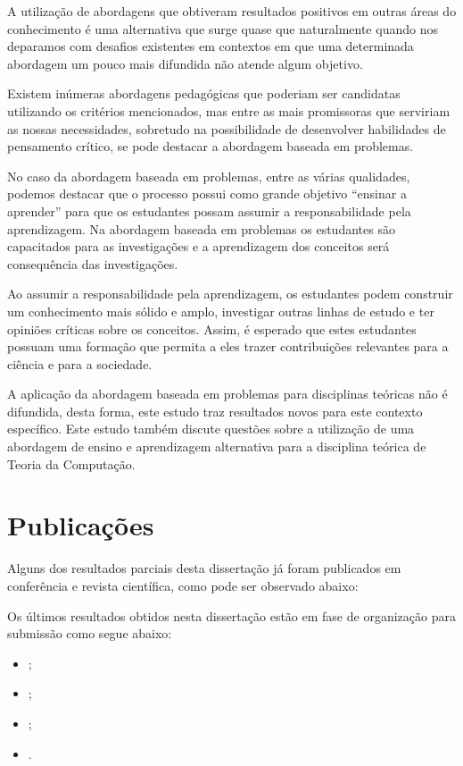 A utilização de abordagens que obtiveram
resultados positivos em outras áreas do conhecimento é uma
alternativa que surge quase que naturalmente quando
nos deparamos com desafios existentes em contextos
em que uma determinada abordagem um pouco mais difundida
não atende algum objetivo.

Existem inúmeras abordagens pedagógicas que poderiam ser
candidatas utilizando os critérios mencionados,
mas entre as mais promissoras que serviriam
as nossas necessidades, sobretudo na possibilidade
de desenvolver habilidades de pensamento crítico, se
pode destacar a abordagem baseada em problemas.

No caso da abordagem baseada em problemas, entre as
várias qualidades, podemos destacar que o processo
possui como grande objetivo ``ensinar a aprender'' para
que os estudantes possam assumir a
responsabilidade pela aprendizagem.
Na abordagem baseada em problemas os estudantes
são capacitados para as investigações e a aprendizagem
dos conceitos será consequência das investigações.

Ao assumir a responsabilidade pela aprendizagem, os
estudantes podem construir um conhecimento mais sólido
e amplo, investigar outras linhas de estudo e ter opiniões
críticas sobre os conceitos.
Assim, é esperado que estes estudantes possuam uma
formação que permita a eles trazer contribuições
relevantes para a ciência e para a sociedade.

A aplicação da abordagem baseada em problemas
para disciplinas teóricas não é difundida, desta forma,
este estudo traz resultados novos para este contexto
específico.
Este estudo também discute questões sobre a utilização
de uma abordagem de ensino e aprendizagem alternativa
para a disciplina teórica de Teoria da Computação.

\section{Publicações}
\label{sec-publicacoes}
Alguns dos resultados parciais desta dissertação já
foram publicados em conferência e revista científica,
como pode ser observado abaixo:
\begin{itemize}

\end{itemize}
Os últimos resultados obtidos nesta dissertação estão
em fase de organização para submissão como segue abaixo:

\begin{itemize}
\item{;}
\item{;}
\item{;}
\item{.}
\end{itemize}


